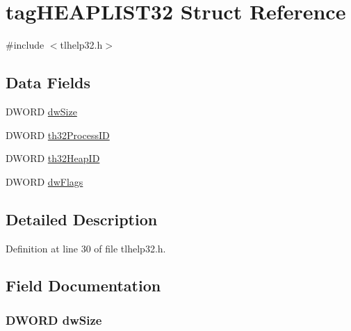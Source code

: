 \hypertarget{structtag_h_e_a_p_l_i_s_t32}{}\section{tag\+H\+E\+A\+P\+L\+I\+S\+T32 Struct Reference}
\label{structtag_h_e_a_p_l_i_s_t32}


{\ttfamily \#include $<$tlhelp32.\+h$>$}

\subsection*{Data Fields}
\begin{DoxyCompactItemize}
\item 
D\+W\+O\+RD \hyperlink{structtag_h_e_a_p_l_i_s_t32_a669c5a85f5a9eb97e64ad880fadaaa2d}{dw\+Size}
\item 
D\+W\+O\+RD \hyperlink{structtag_h_e_a_p_l_i_s_t32_a4e94a85eb6671f7346bc1fb284f56186}{th32\+Process\+ID}
\item 
D\+W\+O\+RD \hyperlink{structtag_h_e_a_p_l_i_s_t32_a382f1b4f880ccd90252ea23ad7adec98}{th32\+Heap\+ID}
\item 
D\+W\+O\+RD \hyperlink{structtag_h_e_a_p_l_i_s_t32_a4d2f405b1141000eb2af256e0fc8b98b}{dw\+Flags}
\end{DoxyCompactItemize}


\subsection{Detailed Description}


Definition at line 30 of file tlhelp32.\+h.



\subsection{Field Documentation}
\subsubsection[{\texorpdfstring{dw\+Size}{dwSize}}]{\setlength{\rightskip}{0pt plus 5cm}D\+W\+O\+RD dw\+Size}\hypertarget{structtag_h_e_a_p_l_i_s_t32_a669c5a85f5a9eb97e64ad880fadaaa2d}{}\label{structtag_h_e_a_p_l_i_s_t32_a669c5a85f5a9eb97e64ad880fadaaa2d}


